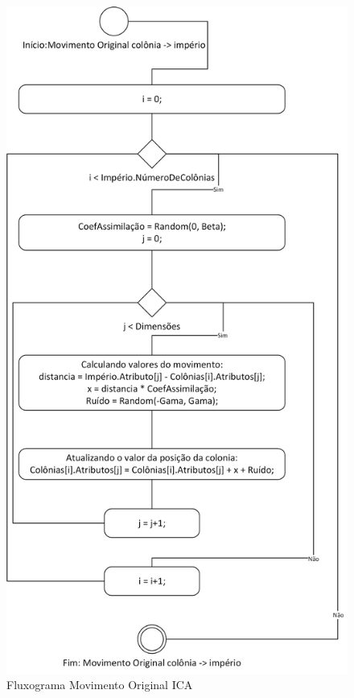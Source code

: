\begin{figure}[hp]
	\centering
	\includegraphics[scale=0.7]{Figuras/Fluxograms-ColinyEmpireMovement.png}
	\caption{Fluxograma Movimento Original ICA }
	\label{fig:Fluxograms-ColinyEmpireMovement}
\end{figure}	

